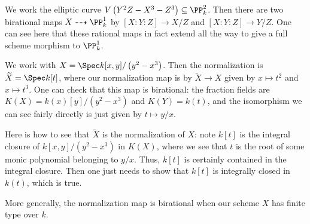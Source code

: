\documentclass[../notes.tex]{subfiles}
\begin{document}
\begin{example}
	We work the elliptic curve $V\left(Y^2Z-X^3-Z^3\right)\subseteq\PP^2_k$. Then there are two birational maps $X\dashrightarrow\PP^1_k$ by $[X:Y:Z]\to X/Z$ and $[X:Y:Z]\to Y/Z$. One can see here that these rational maps in fact extend all the way to give a full scheme morphism to $\PP^1_k$.
\end{example}
\begin{example}
	We work with $X=\Spec k[x,y]/\left(y^2-x^3\right)$. Then the normalization is $\widetilde X=\Spec k[t]$, where our normalization map is by $\widetilde X\to X$ given by $x\mapsto t^2$ and $x\mapsto t^3$. One can check that this map is birational: the fraction fields are $K(X)=k(x)[y]/\left(y^2-x^3\right)$ and $K(Y)=k(t)$, and the isomorphism we can see fairly directly is just given by $t\mapsto y/x$.
\end{example}
\begin{remark}
	Here is how to see that $\widetilde X$ is the normalization of $X$: note $k[t]$ is the integral closure of $k[x,y]/\left(y^2-x^3\right)$ in $K(X)$, where we see that $t$ is the root of some monic polynomial belonging to $y/x$. Thus, $k[t]$ is certainly contained in the integral closure. Then one just needs to show that $k[t]$ is integrally closed in $k(t)$, which is true.
\end{remark}
\begin{remark}
	More generally, the normalization map is birational when our scheme $X$ has finite type over $k$.
\end{remark}
\end{document}
